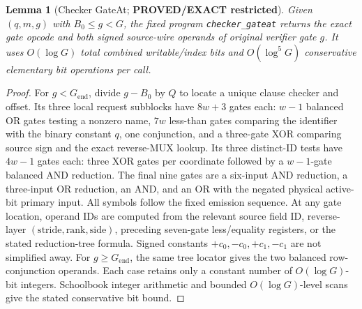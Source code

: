 \documentclass[11pt]{article}
\newtheorem{lemma}[theorem]{Lemma}
\begin{document}
\begin{lemma}[Checker GateAt; \textbf{PROVED/EXACT restricted}]
Given $(q,m,g)$ with $B_0\le g<G$, the fixed program
\texttt{checker\_gateat} returns the exact gate opcode and both
\emph{signed} source-wire operands of original verifier gate $g$.
It uses $O(\log G)$ total combined writable/index bits and
$O(\log^5G)$ conservative elementary bit operations per call.
\end{lemma}
\begin{proof}
For $g<G_{\mathrm{end}}$, divide $g-B_0$ by $Q$ to locate a unique
clause checker and offset. Its three local request subblocks have
$8w+3$ gates each: $w-1$ balanced OR gates testing a nonzero name,
$7w$ less-than gates comparing the identifier with the binary constant
$q$, one conjunction, and a three-gate XOR comparing source sign and
the exact reverse-MUX lookup. Its three distinct-ID tests have $4w-1$
gates each: three XOR gates per coordinate followed by a $w-1$-gate
balanced AND reduction. The final nine gates are a six-input AND
reduction, a three-input OR reduction, an AND, and an OR with the
negated physical active-bit primary input. All symbols follow the
fixed emission sequence. At any gate location, operand IDs are
computed from the relevant source field ID, reverse-layer
$(\mathrm{stride},\mathrm{rank},\mathrm{side})$, preceding seven-gate
less/equality registers, or the stated reduction-tree formula.
Signed constants $+c_0,-c_0,+c_1,-c_1$ are not simplified away.
For $g\ge G_{\mathrm{end}}$, the same tree locator gives the two
balanced row-conjunction operands. Each case retains only a constant
number of $O(\log G)$-bit integers. Schoolbook integer arithmetic and
bounded $O(\log G)$-level scans give the stated conservative bit bound.
\end{proof}
\end{document}
